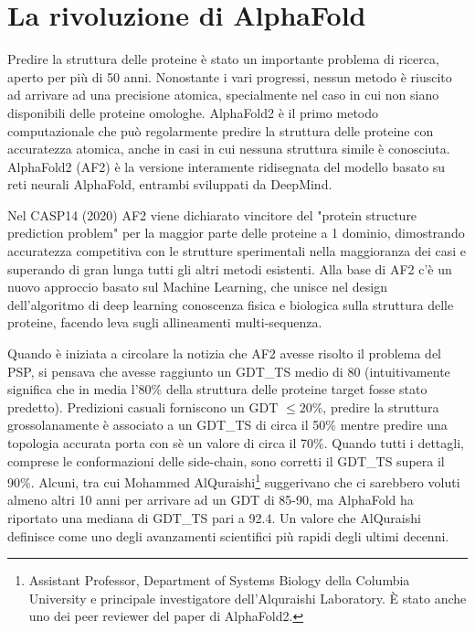 \chapter{La rivoluzione di AlphaFold}

Predire la struttura delle proteine è stato un importante problema di ricerca, aperto per più di 50 anni. Nonostante i vari progressi, nessun metodo è riuscito ad arrivare ad una precisione atomica, specialmente nel caso in cui non siano disponibili delle proteine omologhe. AlphaFold2 è il primo metodo computazionale che può regolarmente predire la struttura delle proteine con accuratezza atomica, anche in casi in cui nessuna struttura simile è conosciuta\supercite{jumper2021highly}.
AlphaFold2 (AF2) è la versione interamente ridisegnata del modello basato su reti neurali AlphaFold, entrambi sviluppati da DeepMind. 

\par Nel CASP14 (2020) AF2 viene dichiarato vincitore del "protein structure prediction problem" per la maggior parte delle proteine a 1 dominio, dimostrando accuratezza competitiva con le strutture sperimentali nella maggioranza dei casi e superando di gran lunga tutti gli altri metodi esistenti. Alla base di AF2 c'è un nuovo approccio basato sul Machine Learning, che unisce nel design dell'algoritmo di deep learning conoscenza fisica e biologica sulla struttura delle proteine, facendo leva sugli allineamenti multi-sequenza.

\par Quando è iniziata a circolare la notizia che AF2 avesse risolto il problema del PSP, si pensava che avesse raggiunto un GDT\_TS medio di 80 \supercite{moalqAF2} (intuitivamente significa che in media l'80\% della struttura delle proteine target fosse stato predetto). Predizioni casuali forniscono un GDT $\leq 20 \%$, predire la struttura grossolanamente è associato a un GDT\_TS di circa il 50\% mentre predire una topologia accurata porta con sè un valore di circa il 70\%. Quando tutti i dettagli, comprese le conformazioni delle side-chain, sono corretti il GDT\_TS supera il 90\%. Alcuni, tra cui Mohammed AlQuraishi\footnote{Assistant Professor, Department of Systems Biology della Columbia University e principale investigatore dell'Alquraishi Laboratory. È stato anche uno dei peer reviewer del paper di AlphaFold2\supercite{moalqAF2}.} suggerivano che ci sarebbero voluti almeno altri 10 anni per arrivare ad un GDT di 85-90\supercite{moAlq}, ma AlphaFold ha riportato una mediana di GDT\_TS pari a 92.4. Un valore che AlQuraishi definisce come uno degli avanzamenti scientifici più rapidi degli ultimi decenni.

